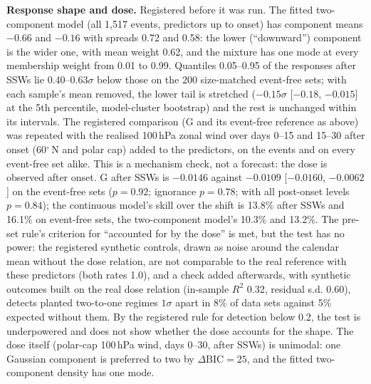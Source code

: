 \documentclass[11pt]{article}
\begin{document}
\textbf{Response shape and dose.} Registered before it was run. The fitted two-component model (all 1,517 events, predictors up to onset) has component means $-0.66$ and $-0.16$ with spreads 0.72 and 0.58: the lower (“downward”) component is the wider one, with mean weight 0.62, and the mixture has one mode at every membership weight from 0.01 to 0.99. Quantiles 0.05–0.95 of the responses after SSWs lie 0.40–$0.63\sigma$ below those on the 200 size-matched event-free sets; with each sample's mean removed, the lower tail is stretched ($-0.15\sigma$ [$-0.18$, $-0.015$] at the 5th percentile, model-cluster bootstrap) and the rest is unchanged within its intervals. The registered comparison (G and its event-free reference as above) was repeated with the realised 100\,hPa zonal wind over days 0–15 and 15–30 after onset (60$^\circ$\,N and polar cap) added to the predictors, on the events and on every event-free set alike. This is a mechanism check, not a forecast: the dose is observed after onset. G after SSWs is $-0.0146$ against $-0.0109$ [$-0.0160$, $-0.0062$] on the event-free sets ($p = 0.92$; ignorance $p = 0.78$; with all post-onset levels $p = 0.84$); the continuous model's skill over the shift is 13.8\% after SSWs and 16.1\% on event-free sets, the two-component model's 10.3\% and 13.2\%. The pre-set rule's criterion for “accounted for by the dose” is met, but the test has no power: the registered synthetic controls, drawn as noise around the calendar mean without the dose relation, are not comparable to the real reference with these predictors (both rates 1.0), and a check added afterwards, with synthetic outcomes built on the real dose relation (in-sample $R^2$ 0.32, residual s.d. 0.60), detects planted two-to-one regimes $1\sigma$ apart in 8\% of data sets against 5\% expected without them. By the registered rule for detection below 0.2, the test is underpowered and does not show whether the dose accounts for the shape. The dose itself (polar-cap 100\,hPa wind, days 0–30, after SSWs) is unimodal: one Gaussian component is preferred to two by $\Delta\mathrm{BIC} = 25$, and the fitted two-component density has one mode.
\end{document}
